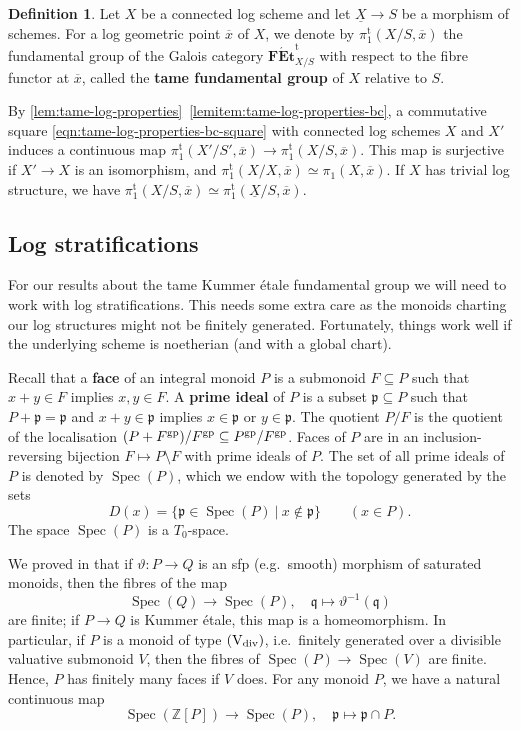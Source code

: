 \documentclass[a4paper,twoside,11pt,reqno]{amsart}
\renewcommand{\mathbb}{\mathds}
\newcommand{\bZ}{{\mathbb Z}}
\newcommand{\fp}{{\mathfrak p}}
\newcommand{\fq}{{\mathfrak q}}
\newcommand{\la}{\longrightarrow}
\DeclareMathOperator{\Spec}{Spec}
\newcommand{\cat}[1]{\mathbf{#1}}
\newcommand{\ov}[1]{\overline{#1}}
\newcommand{\vtheta}{\vartheta}
\newcommand{\typeVd}{(\mathrm{V}_{\rm div})}
\newcommand{\pitame}{\pi_1^{\mathrm{t}}}
\newcommand{\FEtt}{{\cat{F\acute{E}t}}^{\!\mathrm{t}}}
\theoremstyle{definition}
\newtheorem{defi}[thm]{Definition}
\numberwithin{equation}{subsection}
\begin{document}
\begin{defi} \label{def:FKEt-pi1-tame}
    Let $X$ be a connected log scheme and let $\underline{X}\to S$ be a morphism of schemes. For a log geometric point $\overline{x}$ of $X$, we denote by $\pitame(X/S, \overline{x})$ the fundamental group of the Galois category $\FEtt_{X/S}$ with respect to the fibre functor at $\ov{x}$, called the {\bf tame fundamental group} of $X$ relative to $S$. 
\end{defi}

By \cref{lem:tame-log-properties}~\ref{lemitem:tame-log-properties-bc}, a commutative square \eqref{eqn:tame-log-properties-bc-square} with connected log schemes $X$ and $X'$ induces a continuous map $\pitame(X'/S',\ov x)\to\pitame(X/S,\ov x)$. This map is surjective if $X'\to X$ is an isomorphism, and $\pitame(X/X,\ov{x})\simeq \pi_1(X,\ov{x})$. If $X$ has trivial log structure, we have $\pitame(X/S,\ov{x})\simeq \pitame(\underline{X}/S,\ov{x})$.


\subsection{Log stratifications}
\label{ss:log-strat}

For our results about the tame Kummer \'etale fundamental group we will need to work with log stratifications. This needs some extra care as the monoids charting our log structures might not be finitely generated. Fortunately, things work well if the underlying scheme is noetherian (and with a global chart). 

Recall that a {\bf face} of an integral monoid $P$ is a submonoid $F\subseteq P$ such that $x+y\in F$ implies $x, y\in F$. A {\bf prime ideal} of $P$ is a subset $\fp\subseteq P$ such that $P + \fp = \fp$ and $x+y\in \fp$ implies $x\in \fp$ or $y\in \fp$. The quotient $P/F$ is the quotient of the localisation $(P+F^{\rm gp})/F^{\rm gp} \subseteq P^{\rm gp}/F^{\rm gp}$. Faces of $P$ are in an inclusion-reversing bijection $F \mapsto P \setminus F$ with prime ideals of $P$. The set of all prime ideals of $P$ is denoted by $\Spec(P)$, which we endow with the topology generated by the sets
\[
    D(x) = \{\fp \in \Spec(P) \ | \ x \notin \fp\} \qquad (x\in P).
\]
The space $\Spec(P)$ is a $T_0$-space. 

We proved in \cite[Corollary~2.3.3]{AHLS-Log} that if $\vtheta\colon P\to Q$ is an sfp (e.g.\ smooth) morphism of saturated monoids, then the fibres of the map 
\[ 
    \Spec(Q)\la \Spec(P), \quad \fq \mapsto \vtheta^{-1}(\fq)
\]
are finite; if $P\to Q$ is Kummer \'etale, this map is a homeomorphism. In particular, if $P$ is a monoid of type $\typeVd$, i.e.\ finitely generated over a divisible valuative submonoid $V$, 
then the fibres of $\Spec(P)\to \Spec(V)$ are finite. Hence, $P$ has finitely many faces if $V$ does. For any monoid $P$, we have a natural continuous map
\begin{equation} \label{eqn:SpecZP-to-SpecP} 
    \Spec(\bZ[P]) \la \Spec(P), \quad \fp \mapsto \fp\cap P.
\end{equation}
\end{document}
